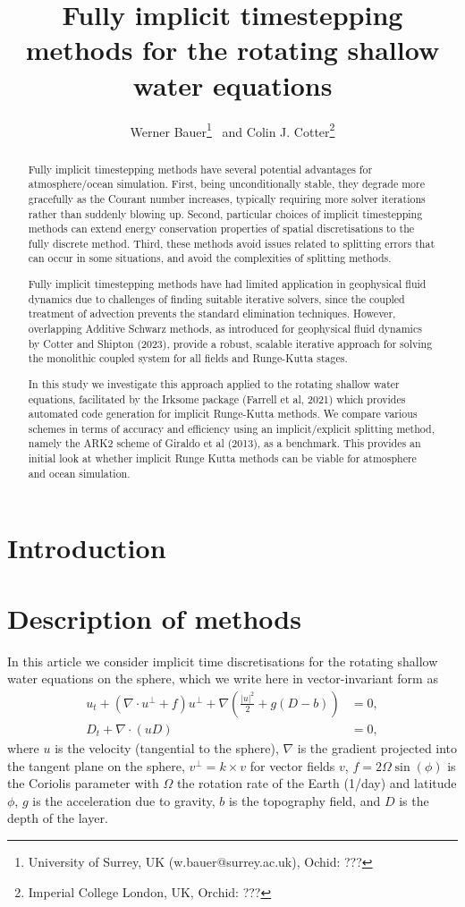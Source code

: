 \documentclass[a4paper,10pt]{article}
\title{Fully implicit timestepping methods for the rotating shallow water equations}
\author{Werner Bauer\footnote{University of Surrey, UK (w.bauer@surrey.ac.uk), Ochid: ???} \ and
Colin J. Cotter\footnote{Imperial College London, UK, Orchid: ???}  }
\begin{document}
\maketitle

\begin{abstract}
Fully implicit timestepping methods have several potential advantages for atmosphere/ocean simulation. First, being unconditionally stable, they degrade more gracefully as the Courant number increases, typically requiring more solver iterations rather than suddenly blowing up. Second, particular choices of implicit timestepping methods can extend energy conservation properties of spatial discretisations to the fully discrete method. Third, these methods avoid issues related to splitting errors that can occur in some situations, and avoid the complexities of splitting methods.

Fully implicit timestepping methods have had limited application in geophysical fluid dynamics due to challenges of finding suitable iterative solvers, since the coupled treatment of advection prevents the standard elimination techniques. However, overlapping Additive Schwarz methods, as introduced for geophysical fluid dynamics by Cotter and Shipton (2023), provide a robust, scalable iterative approach for solving the monolithic coupled system for all fields and Runge-Kutta stages.

In this study we investigate this approach applied to the rotating shallow water equations, facilitated by the Irksome package (Farrell et al, 2021) which provides automated code generation for implicit Runge-Kutta methods. We compare various schemes in terms of accuracy and efficiency using an implicit/explicit splitting method, namely the ARK2 scheme of Giraldo et al (2013), as a benchmark. This provides an initial look at whether implicit Runge Kutta methods can be viable for atmosphere and ocean simulation.
\end{abstract}

\section{Introduction}


\section{Description of methods}

In this article we consider implicit time discretisations for the
rotating shallow water equations on the sphere, which we write
here in vector-invariant form as
\begin{align}
  u_t + \left(\nabla\cdot u^\perp + f\right)u^\perp
  + \nabla\left(\frac{|u|^2}{2} + g(D-b)\right) & = 0, \\
  D_t + \nabla\cdot(uD) & = 0,
\end{align}
where $u$ is the velocity (tangential to the sphere), $\nabla$ is the
gradient projected into the tangent plane on the sphere, $v^\perp =
k\times v$ for vector fields $v$, $f=2\Omega \sin(\phi)$ is the
Coriolis parameter with $\Omega$ the rotation rate of the Earth
(1/day) and latitude $\phi$, $g$ is the acceleration due to gravity,
$b$ is the topography field, and $D$ is the depth of the layer.
\end{document}
